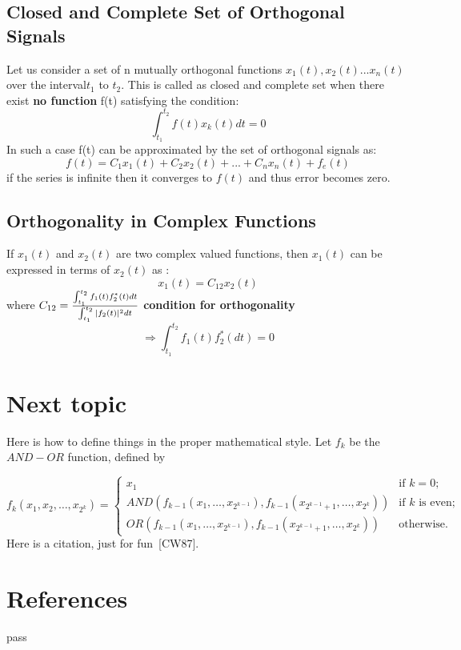 \documentclass[a4paper,12pt]{book}
\renewcommand{\cite}[1]{[#1]}
\begin{document}
\subsection{Closed and Complete Set of Orthogonal Signals}
Let us consider a set of n mutually orthogonal functions $x_1(t),x_2(t)...x_n(t)$ over the interval$t_1$ to $t_2$. This is called as closed and complete set when there exist {\bf no function} f(t) satisfying the condition:
$$\int_{t_1}^{t_2} f(t)x_k(t)dt = 0$$
In such a case f(t) can be approximated by the set of orthogonal signals as:
$$f(t) = C_1 x_1(t) + C_2 x_2(t) + ... + C_n x_n(t) + f_e(t)$$
if the series is infinite then it converges to $f(t)$ and thus error becomes zero.
\subsection{Orthogonality in Complex Functions}
If $x_1(t)$ and $x_2(t)$ are two complex valued functions, then $x_1(t)$ can be expressed in terms of $x_2(t)$ as :
$$x_1(t) = C_{12}x_2(t)$$
where $C_{12} = {{\int_{t_1}^{t_2} f_1(t)f_2^*(t)dt} \over { \int_{t_1}^{t_2} |f_2(t)|^2 dt}}$
{\bf condition for orthogonality}\\
$$\Rightarrow  \int_{t_1}^{t_2} f_1 (t) f_2^* (dt) = 0$$
\section{Next topic}
\begingroup
\centering


Here is how to define things in the proper mathematical style.
Let $f_k$ be the $AND-OR$ function, defined by

\[ f_k(x_1, x_2, \ldots, x_{2^k}) = \left\{ \begin{array}{ll}

	x_1 & \mbox{if $k = 0$;} \\

	AND(f_{k-1}(x_1, \ldots, x_{2^{k-1}}),
	   f_{k-1}(x_{2^{k-1} + 1}, \ldots, x_{2^k}))
	 & \mbox{if $k$ is even;} \\

	OR(f_{k-1}(x_1, \ldots, x_{2^{k-1}}),
	   f_{k-1}(x_{2^{k-1} + 1}, \ldots, x_{2^k}))	
	& \mbox{otherwise.} 
	\end{array}
	\right. \]
Here is a citation, just for fun~\cite{CW87}.
\section*{References}
pass
\end{document}
